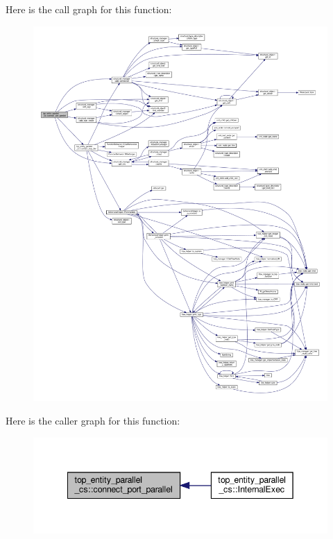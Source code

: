 Here is the call graph for this function\+:
\nopagebreak
\begin{figure}[H]
\begin{center}
\leavevmode
\includegraphics[width=350pt]{d8/d37/classtop__entity__parallel__cs_ae9f5f5887e789f3abb4ee2786f6f9980_cgraph}
\end{center}
\end{figure}
Here is the caller graph for this function\+:
\nopagebreak
\begin{figure}[H]
\begin{center}
\leavevmode
\includegraphics[width=342pt]{d8/d37/classtop__entity__parallel__cs_ae9f5f5887e789f3abb4ee2786f6f9980_icgraph}
\end{center}
\end{figure}
\mbox{\label{classtop__entity__parallel__cs_a1df713ee7535a6ef73f1df004ca4aa43}} 

